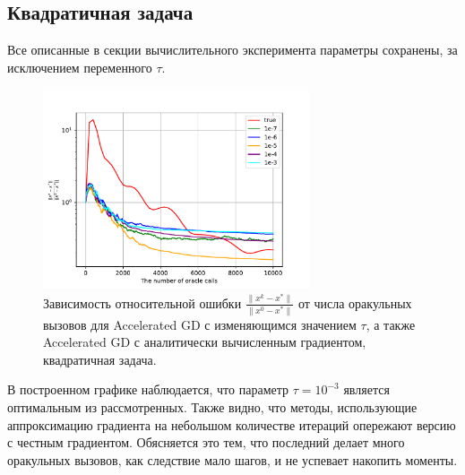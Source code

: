 \documentclass{article}
\begin{document}
\subsection{Квадратичная задача}
Все описанные в секции вычислительного эксперимента параметры сохранены, за исключением переменного $\tau$.\\
\begin{figure}[!htbp]
\centering
  \includegraphics[width=0.7\textwidth]{../figures/Error_analysis_quadratic_sigma=1e-6.pdf}
 \caption{Зависимость относительной ошибки $\frac{\|x^k - x^*\|}{\|x^0 - x^*\|}$ от числа оракульных вызовов для Accelerated GD с изменяющимся значением $\tau$, а также Accelerated GD с аналитически вычисленным градиентом, квадратичная задача.}
  \label{fig:error_quadratic}
\end{figure}
В построенном графике наблюдается, что параметр $\tau=10^{-3}$ является оптимальным из рассмотренных. Также видно, что методы, использующие аппроксимацию градиента на небольшом количестве итераций опережают версию с честным градиентом. Обясняется это тем, что последний делает много оракульных вызовов, как следствие мало шагов, и не успевает накопить моменты.
\end{document}
